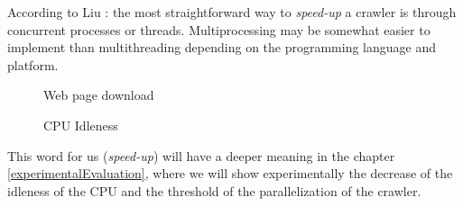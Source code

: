 According to Liu \cite[p. 322]{L2011}: the most straightforward way to \emph{speed-up} a crawler is through concurrent processes or threads. Multiprocessing may be somewhat easier to implement than multithreading depending on the programming language and platform.

\begin{figure}\centering
	\caption{Web page download}\label{fig:Bandwidth}
\end{figure}


\begin{figure}\centering
	\caption{CPU Idleness}\label{fig:CPUIdleness}
\end{figure}

This word for us (\emph{speed-up}) will have a deeper meaning in the chapter \ref{experimentalEvaluation}, where we will show experimentally the decrease of the idleness of the CPU and the threshold of the parallelization of the crawler.